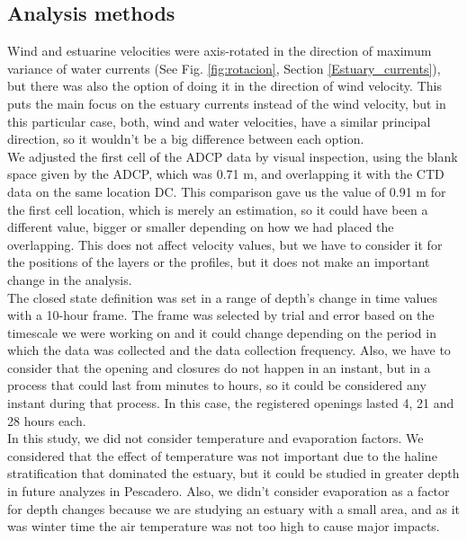 \documentclass[tesis.tex]{subfiles}
\begin{document}
\subsection{Analysis methods}

Wind and estuarine velocities were axis-rotated in the direction of maximum variance of water currents (See Fig. \ref{fig:rotacion}, Section \ref{Estuary_currents}), but there was also the option of doing it in the direction of wind velocity. This puts the main focus on the estuary currents instead of the wind velocity, but in this particular case, both, wind and water velocities, have a similar principal direction, so it wouldn't be a big difference between each option.\\

We adjusted the first cell of the ADCP data by visual inspection, using the blank space given by the ADCP, which was 0.71 m, and overlapping it with the CTD data on the same location DC. This comparison gave us the value of 0.91 m for the first cell location, which is merely an estimation, so it could have been a different value, bigger or smaller depending on how we had placed the overlapping. This does not affect velocity values, but we have to consider it for the positions of the layers or the profiles, but it does not make an important change in the analysis.\\

The closed state definition was set in a range of depth's change in time values with a 10-hour frame. The frame was selected by trial and error based on the timescale we were working on and it could change depending on the period in which the data was collected and the data collection frequency. Also, we have to consider that the opening and closures do not happen in an instant, but in a process that could last from minutes to hours, so it could be considered any instant during that process. In this case, the registered openings lasted 4, 21 and 28 hours each.\\ 

In this study, we did not consider temperature and evaporation factors. We considered that the effect of temperature was not important due to the haline stratification that dominated the estuary, but it could be studied in greater depth in future analyzes in Pescadero. Also, we didn't consider evaporation as a factor for depth changes because we are studying an estuary with a small area, and as it was winter time the air temperature was not too high to cause major impacts.\\
\end{document}
